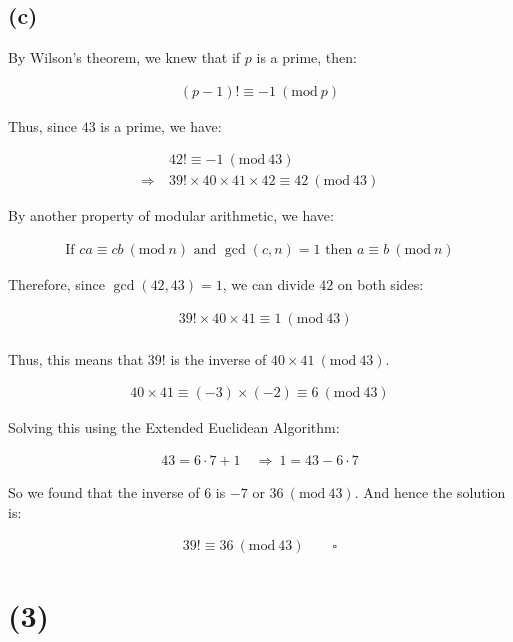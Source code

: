 \documentclass{article}
\newcommand{\modwos}[1]{\ (\mathrm{mod}\ #1)}
\begin{document}
\subsection*{(c)}

By Wilson's theorem, we knew that if $p$ is a prime, then:

\begin{align*}
    (p-1)! \equiv -1 \modwos{p}
\end{align*}

Thus, since $43$ is a prime, we have:

\begin{align*}
    &42! \equiv -1 \modwos{43} \\
    \Rightarrow \ & 39! \times 40 \times 41 \times 42 \equiv 42 \modwos{43}
\end{align*}

By another property of modular arithmetic, we have:

\begin{align*}
    \text{If } ca \equiv cb \modwos{n} \text{ and } \gcd(c, n) = 1 \text{ then } a \equiv b \modwos{n}
\end{align*}

Therefore, since $\gcd(42, 43) = 1$, we can divide $42$ on both sides:

\begin{align*}
    &39! \times 40 \times 41 \equiv 1 \modwos{43} \\
\end{align*}

Thus, this means that $39!$ is the inverse of $40 \times 41 \modwos{43}$.

\begin{align*}
    40 \times 41 \equiv (-3) \times (-2) \equiv 6 \modwos{43}
\end{align*}


Solving this using the Extended Euclidean Algorithm:

\begin{align*}
    43 = 6 \cdot 7 + 1 \quad \Rightarrow \ 1 = 43 - 6 \cdot 7 
\end{align*}

So we found that the inverse of $6$ is $-7$ or $36 \modwos{43}$. And hence the solution is:

\begin{align*}
    39! \equiv 36 \modwos{43} \qquad \square
\end{align*}


\section*{(3)}
\end{document}
